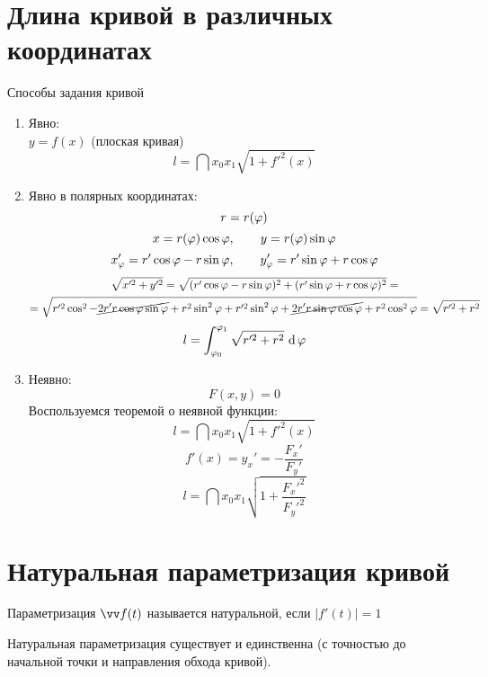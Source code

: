 \section{Длина кривой в различных координатах}

\begin{undefthm}{Способы задания кривой}
	\begin{enumerate}
		\item Явно: \\
		$ y = f(x) $ (плоская кривая)
		$$ l = \dint{x_0}{x_1}{\sqrt{1 + f'^2(x)}} $$
		\item Явно в полярных координатах:
		$$ r = r(\vphi) $$
		$$ x = r(\vphi)\cos \vphi, \qquad y = r(\vphi)\sin \vphi $$
		$$ x_\vphi' = r'\cos \vphi - r\sin \vphi, \qquad y_\vphi' = r'\sin \vphi + r\cos\vphi $$
		\begin{multline*}
			\sqrt{x'^2 + y'^2} = \sqrt{(r'\cos\vphi - r\sin\vphi)^2 + (r'\sin\vphi + r\cos\vphi)^2} = \\
			= \sqrt{r'^2\cos^2 - \cancel{2r'r\cos\vphi\sin\vphi} + r^2\sin^2\vphi + r'^2\sin^2\vphi + \cancel{2r'r\sin\vphi\cos\vphi} + r^2\cos^2\vphi} = \sqrt{r'^2 + r^2}
		\end{multline*}
		$$ l = \dint[\vphi]{\vphi_0}{\vphi_1}{\sqrt{r'^2 + r^2}} $$
		\item Неявно:
		$$ F(x, y) = 0 $$
		Воспользуемся теоремой о неявной функции:
		$$ l = \dint{x_0}{x_1}{\sqrt{1 + f'^2(x)}} $$
		$$ f'(x) = y_x' = -\frac{F_x'}{F_y'} $$
		$$ l = \dint{x_0}{x_1}{\sqrt{1 + \frac{F_x'^2}{F_y'^2}}} $$
	\end{enumerate}
\end{undefthm}

\section{Натуральная параметризация кривой}

\begin{definition}
	Параметризация $ \vv f(t) $ называется натуральной, если $ |f'(t)| = 1 $
\end{definition}

\begin{theorem}\label{th:natural_par}
	Натуральная параметризация существует и единственна (с точностью до начальной точки и направления обхода кривой).
\end{theorem}

